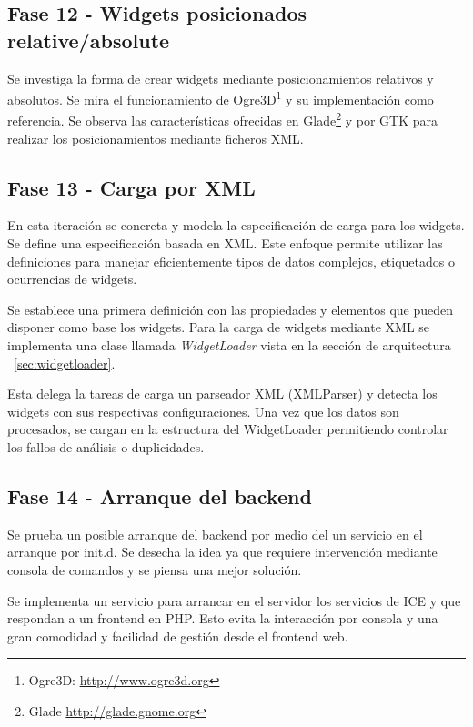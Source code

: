 \subsection{Fase 12 - Widgets posicionados relative/absolute}

Se investiga la forma de crear widgets mediante posicionamientos relativos y
absolutos. Se mira el funcionamiento de Ogre3D\footnote{Ogre3D:
\url{http://www.ogre3d.org}} y su implementación como referencia. Se observa las
características ofrecidas en Glade\footnote{Glade \url{http://glade.gnome.org}} 
y por GTK para realizar los posicionamientos mediante ficheros XML.

\subsection{Fase 13 - Carga por XML}

En esta iteración se concreta y modela la especificación de carga para los
widgets. Se define una especificación basada en XML. Este enfoque permite
utilizar las definiciones para manejar eficientemente tipos de datos 
complejos, etiquetados o ocurrencias de widgets.

Se establece una primera definición con las propiedades y elementos que pueden
disponer como base los widgets. Para la carga de widgets mediante XML se
implementa una clase llamada \emph{WidgetLoader} vista en la sección de arquitectura
~\ref{sec:widgetloader}.

Esta delega la tareas de carga un parseador XML (XMLParser) y detecta los
widgets con sus respectivas configuraciones. Una vez que los datos son
procesados, se cargan en la estructura del WidgetLoader permitiendo controlar 
los fallos de análisis o duplicidades.

\subsection{Fase 14 - Arranque del backend}

Se prueba un posible arranque del backend por medio del un servicio en el
arranque por init.d. Se desecha la idea ya que requiere intervención mediante
consola de comandos y se piensa una mejor solución.

Se implementa un servicio para arrancar en el servidor los
servicios de ICE y que respondan a un frontend en PHP. Esto evita la interacción
por consola y una gran comodidad y facilidad de gestión desde el frontend web.

\newpage

